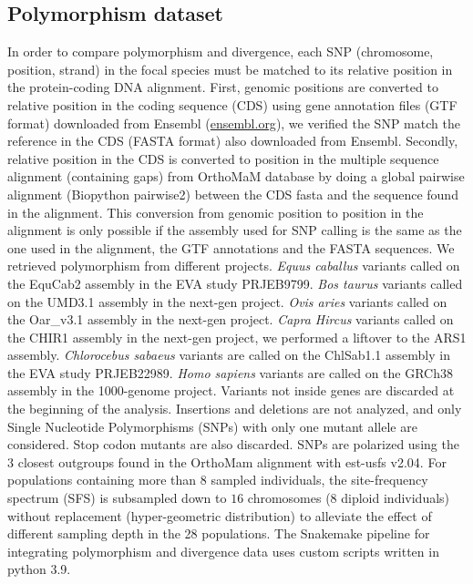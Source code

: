 \documentclass{article}
\begin{document}
    \subsection{Polymorphism dataset}
    \label{subsec:polymorphism-dataset}

    In order to compare polymorphism and divergence, each SNP (chromosome, position, strand) in the focal species must be matched to its relative position in the protein-coding DNA alignment.
    First, genomic positions are converted to relative position in the coding sequence (CDS) using gene annotation files (GTF format) downloaded from Ensembl (\url{ensembl.org}), we verified the SNP match the reference in the CDS (FASTA format) also downloaded from Ensembl.
    Secondly, relative position in the CDS is converted to position in the multiple sequence alignment (containing gaps) from OrthoMaM database\cite{ranwez_orthomam_2007, douzery_orthomam_2014, scornavacca_orthomam_2019} by doing a global pairwise alignment (Biopython pairwise2) between the CDS fasta and the sequence found in the alignment.
    This conversion from genomic position to position in the alignment is only possible if the assembly used for SNP calling is the same as the one used in the alignment, the GTF annotations and the FASTA sequences.
    We retrieved polymorphism from different projects.
    \textit{Equus caballus} variants called on the EquCab2 assembly in the EVA study PRJEB9799.
    \textit{Bos taurus} variants called on the UMD3.1 assembly in the next-gen project.
    \textit{Ovis aries} variants called on the Oar\_v3.1 assembly in the next-gen project.
    \textit{Capra Hircus} variants called on the CHIR1 assembly in the next-gen project, we performed a liftover to the ARS1 assembly.
    \textit{Chlorocebus sabaeus} variants are called on the ChlSab1.1 assembly in the EVA study PRJEB22989\cite{svardal_ancient_2017}.
    \textit{Homo sapiens} variants are called on the GRCh38 assembly in the 1000-genome project\cite{consortium_integrated_2012, the1000genomesprojectconsortium_global_2015}.
    Variants not inside genes are discarded at the beginning of the analysis.
    Insertions and deletions are not analyzed, and only Single Nucleotide Polymorphisms (SNPs) with only one mutant allele are considered.
    Stop codon mutants are also discarded.
    SNPs are polarized using the $3$ closest outgroups found in the OrthoMam alignment with est-usfs v2.04\cite{keightley_inferring_2018}.
    For populations containing more than $8$ sampled individuals, the site-frequency spectrum (SFS) is subsampled down to $16$ chromosomes ($8$ diploid individuals) without replacement (hyper-geometric distribution) to alleviate the effect of different sampling depth in the 28 populations.
    The Snakemake pipeline for integrating polymorphism and divergence data uses custom scripts written in python 3.9.
\end{document}
